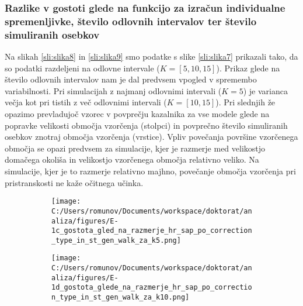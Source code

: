 \subsubsection[\bfseries Razlike v gostoti glede na funkcijo za izračun individualne spremenljivke, število odlovnih intervalov ter število simuliranih osebkov]{Razlike v gostoti glede na funkcijo za izračun individualne spremenljivke, število odlovnih intervalov ter število simuliranih osebkov}
Na slikah \ref{sli:slika8} in \ref{sli:slika9} smo podatke s slike \ref{sli:slika7} prikazali tako, da so podatki razdeljeni na odlovne intervale ($K = [5, 10, 15]$). Prikaz glede na število odlovnih intervalov nam je dal predvsem vpogled v spremembo variabilnosti. Pri simulacijah z najmanj odlovnimi intervali ($K = 5$) je varianca večja kot pri tistih z več odlovnimi intervali ($K = [10, 15]$). Pri slednjih že opazimo prevladujoč vzorec v povprečju kazalnika za vse modele glede na popravke velikosti območja vzorčenja (stolpci) in povprečno število simuliranih osebkov znotraj območja vzorčenja (vrstice). Vpliv povečanja površine vzorčenega območja se opazi predvsem za simulacije, kjer je razmerje med velikostjo domačega okoliša in velikostjo vzorčenega območja relativno veliko. Na simulacije, kjer je to razmerje relativno majhno, povečanje območja vzorčenja pri pristranskosti ne kaže očitnega učinka.

\begin{figure}[H]
  \centering
  \begin{subfigure}[b]{1\textwidth}
    \centering
    \texttt{[image: C:/Users/romunov/Documents/workspace/doktorat/analiza/figures/E-1c\_gostota\_gled\_na\_razmerje\_hr\_sap\_po\_correction\_type\_in\_st\_gen\_walk\_za\_k5.png]}
    \label{sli:sub8.1}
  \end{subfigure}

  \begin{subfigure}[b]{1\textwidth}
    \centering
    \texttt{[image: C:/Users/romunov/Documents/workspace/doktorat/analiza/figures/E-1d\_gostota\_glede\_na\_razmerje\_hr\_sap\_po\_correction\_type\_in\_st\_gen\_walk\_za\_k10.png]}
    \label{sli:sub8.2}
  \end{subfigure}
\end{figure}

